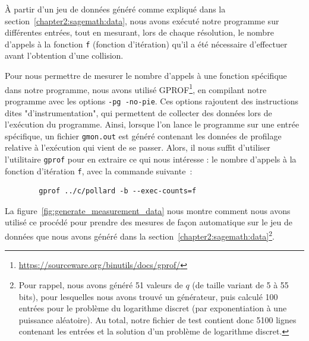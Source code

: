       À partir d'un jeu de données généré comme expliqué dans la section~\ref{chapter2:sagemath:data}, nous avons exécuté notre programme sur différentes entrées, tout en mesurant, lors de chaque résolution, le nombre d'appels à la fonction \lstinline{f} (fonction d'itération) qu'il a été nécessaire d'effectuer avant l'obtention d'une collision.

      Pour nous permettre de mesurer le nombre d'appels à une fonction spécifique dans notre programme, nous avons utilisé GPROF\footnote{\url{https://sourceware.org/binutils/docs/gprof/}}, en compilant notre programme avec les options \lstinline{-pg -no-pie}. Ces options rajoutent des instructions dites "d'instrumentation", qui permettent de collecter des données lors de l'exécution du programme.
      Ainsi, lorsque l'on lance le programme sur une entrée spécifique, un fichier \lstinline{gmon.out} est généré contenant les données de profilage relative à l'exécution qui vient de se passer. Alors, il nous suffit d'utiliser l'utilitaire \lstinline{gprof} pour en extraire ce qui nous intéresse : le nombre d'appels à la fonction d'itération \lstinline{f}, avec la commande suivante~:

      \begin{lstlisting}
        gprof ../c/pollard -b --exec-counts=f
      \end{lstlisting}

      La figure~\ref{fig:generate_measurement_data} nous montre comment nous avons utilisé ce procédé pour prendre des mesures de façon automatique sur le jeu de données que nous avons généré dans la section~\ref{chapter2:sagemath:data}\footnote{Pour rappel, nous avons généré 51 valeurs de $q$ (de taille variant de 5 à 55 bits), pour lesquelles nous avons trouvé un générateur, puis calculé 100 entrées pour le problème du logarithme discret (par exponentiation à une puissance aléatoire). Au total, notre fichier de test contient donc 5100 lignes contenant les entrées et la solution d'un problème de logarithme discret.}.

